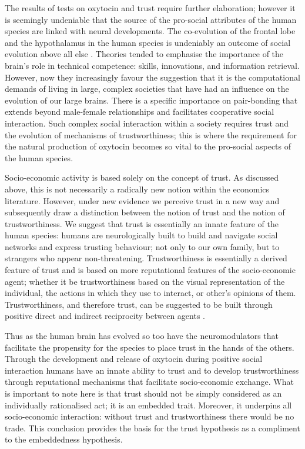 \begin{subappendices}
The results of tests on oxytocin and trust require further elaboration; however it is seemingly undeniable that the source of the pro-social attributes of the human species are linked with neural developments. The co-evolution of the frontal lobe and the hypothalamus in the human species is undeniably an outcome of social evolution above all else \citep{DunbarShultz2007}. Theories tended to emphasise the importance of the brain's role in technical competence: skills, innovations, and information retrieval. However, now they increasingly favour the suggestion that it is the computational demands of living in large, complex societies that have had an influence on the evolution of our large brains. There is a specific importance on pair-bonding that extends beyond male-female relationships and facilitates cooperative social interaction. Such complex social interaction within a society requires trust and the evolution of mechanisms of trustworthiness; this is where the requirement for the natural production of oxytocin becomes so vital to the pro-social aspects of the human species.

Socio-economic activity is based solely on the concept of trust. As discussed above, this is not necessarily a radically new notion within the economics literature. However, under new evidence we perceive trust in a new way and subsequently draw a distinction between the notion of trust and the notion of trustworthiness. We suggest that trust is essentially an innate feature of the human species: humans are neurologically built to build and navigate social networks and express trusting behaviour; not only to our own family, but to strangers who appear non-threatening. Trustworthiness is essentially a derived feature of trust and is based on more reputational features of the socio-economic agent; whether it be trustworthiness based on the visual representation of the individual, the actions in which they use to interact, or other's opinions of them. Trustworthiness, and therefore trust, can be suggested to be built through positive direct and indirect reciprocity between agents \citep{Nowak2005}.

Thus as the human brain has evolved so too have the neuromodulators that facilitate the propensity for the species to place trust in the hands of the others. Through the development and release of oxytocin during positive social interaction humans have an innate ability to trust and to develop trustworthiness through reputational mechanisms that facilitate socio-economic exchange. What is important to note here is that trust should not be simply considered as an individually rationalised act; it is an embedded trait. Moreover, it underpins all socio-economic interaction: without trust and trustworthiness there would be no trade. This conclusion provides the basis for the trust hypothesis as a compliment to the embeddedness hypothesis.


\end{subappendices}
